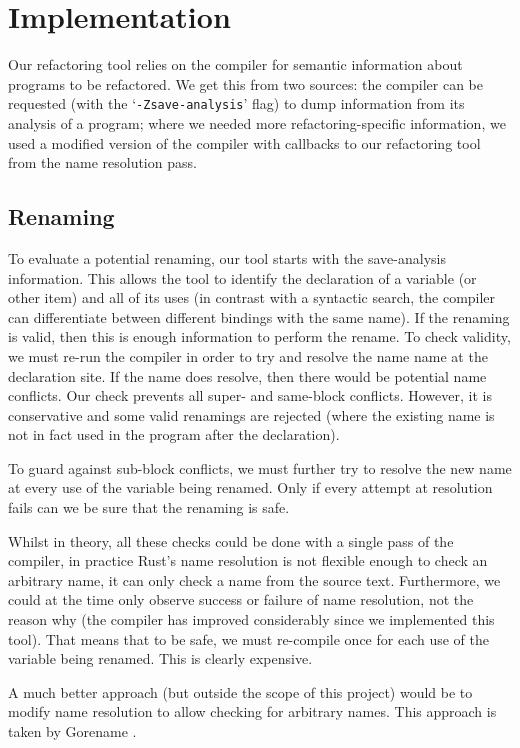 \section{Implementation}\label{C:impl}

Our refactoring tool relies on the compiler for semantic information about programs to be refactored. We get this from two sources: the compiler can be requested (with the `\verb|-Zsave-analysis|' flag) to dump information from its analysis of a program; where we needed more refactoring-specific information, we used a modified version of the compiler with callbacks to our refactoring tool from the name resolution pass.

\subsection{Renaming}

To evaluate a potential renaming, our tool starts with the save-analysis information. This allows the tool to identify the declaration of a variable (or other item) and all of its uses (in contrast with a syntactic search, the compiler can differentiate between different bindings with the same name). If the renaming is valid, then this is enough information to perform the rename. To check validity, we must re-run the compiler in order to try and resolve the name name at the declaration site. If the name does resolve, then there would be potential name conflicts. Our check prevents all super- and same-block conflicts. However, it is conservative and some valid renamings are rejected (where the existing name is not in fact used in the program after the declaration).

To guard against sub-block conflicts, we must further try to resolve the new name at every use of the variable being renamed. Only if every attempt at resolution fails can we be sure that the renaming is safe.

Whilst in theory, all these checks could be done with a single pass of the compiler, in practice Rust's name resolution is not flexible enough to check an arbitrary name, it can only check a name from the source text. Furthermore, we could at the time only observe success or failure of name resolution, not the reason why (the compiler has improved considerably since we implemented this tool). That means that to be safe, we must re-compile once for each use of the variable being renamed. This is clearly expensive.

A much better approach (but outside the scope of this project) would be to modify name resolution to allow checking for arbitrary names. This approach is taken by Gorename \cite{gorename15}.

